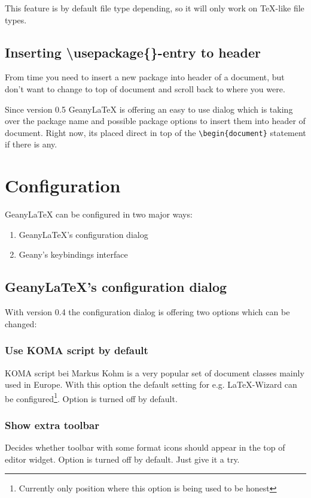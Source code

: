 \documentclass[%
paper=a4,%
fontsize=11pt,%
twoside=false,%
DIV18,
headsepline,
plainheadsepline,
footsepline,
plainfootsepline,
bibliography=totoc,%
listof=totoc,%
BCOR10mm,%
parskip=half,%
openany,%
]{scrartcl}
\begin{document}
This feature is by default file type depending, so it will only work
on \TeX{}-like file types.


\subsection{Inserting \textbackslash{}usepackage\{\}-entry to header}

From time you need to insert a new package into header of a document,
but don't want to change to top of document and scroll back to where you were. 

Since version 0.5 Geany\LaTeX{} is offering an easy to use dialog
which is taking over the package name and possible package options to
insert them into header of document. Right now, its placed direct in
top of the \texttt{\textbackslash{}begin\{document\}} statement if
there is any.

\section{Configuration}

GeanyLaTeX{} can be configured in two major ways:
\begin{enumerate}
\item GeanyLaTeX{}'s configuration dialog
\item Geany's keybindings interface
\end{enumerate}

\subsection{GeanyLaTeX{}'s configuration dialog}
With version 0.4 the configuration dialog is offering two options which
can be changed:

\subsubsection{Use KOMA script by default}
KOMA script bei Markus Kohm is a very popular set of document classes
mainly used in Europe. With this option the default setting for e.g.
\LaTeX{}-Wizard can be configured\footnote{Currently only position where
this option is being used to be honest}. Option is turned off by default.

\subsubsection{Show extra toolbar}
Decides whether toolbar with some format icons should appear in the top
of editor widget. Option is turned off by default. Just give it a try.
\end{document}

